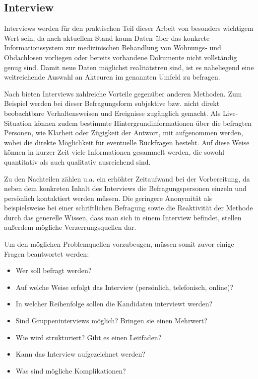 \subsection{Interview}

Interviews werden für den praktischen Teil dieser Arbeit von besonders wichtigem Wert sein, da nach aktuellem Stand kaum Daten über das konkrete Informationssystem zur medizinischen Behandlung von Wohnungs- und Obdachlosen vorliegen oder bereits vorhandene Dokumente nicht vollständig genug sind. Damit neue Daten möglichst realitätstreu sind, ist es naheliegend eine weitreichende Auswahl an Akteuren im genannten Umfeld zu befragen.

Nach \citet{Doering.2015} bieten Interviews zahlreiche Vorteile gegenüber anderen Methoden. Zum Beispiel werden bei dieser Befragungsform subjektive bzw. nicht direkt beobachtbare Verhaltensweisen und Ereignisse zugänglich gemacht. Als Live-Situation können zudem bestimmte Hintergrundinformationen über die befragten Personen, wie Klarheit oder Zügigkeit der Antwort, mit aufgenommen werden, wobei die direkte Möglichkeit für eventuelle Rückfragen besteht. Auf diese Weise können in kurzer Zeit viele Informationen gesammelt werden, die sowohl quantitativ als auch qualitativ ausreichend sind.

Zu den Nachteilen zählen u.a. ein erhöhter Zeitaufwand bei der Vorbereitung, da neben dem konkreten Inhalt des Interviews die Befragungspersonen einzeln und persönlich kontaktiert werden müssen. Die geringere Anonymität als beispielsweise bei einer schriftlichen Befragung sowie die Reaktivität der Methode durch das generelle Wissen, dass man sich in einem Interview befindet, stellen außerdem mögliche Verzerrungsquellen dar.

Um den möglichen Problemquellen vorzubeugen, müssen somit zuvor einige Fragen beantwortet werden:
\begin{itemize}
	\item Wer soll befragt werden?
	\item Auf welche Weise erfolgt das Interview (persönlich, telefonisch, online)?
	\item In welcher Reihenfolge sollen die Kandidaten interviewt werden?
	\item Sind Gruppeninterviews möglich? Bringen sie einen Mehrwert?
	\item Wie wird strukturiert? Gibt es einen Leitfaden?
	\item Kann das Interview aufgezeichnet werden?
	\item Was sind mögliche Komplikationen?
\end{itemize}

